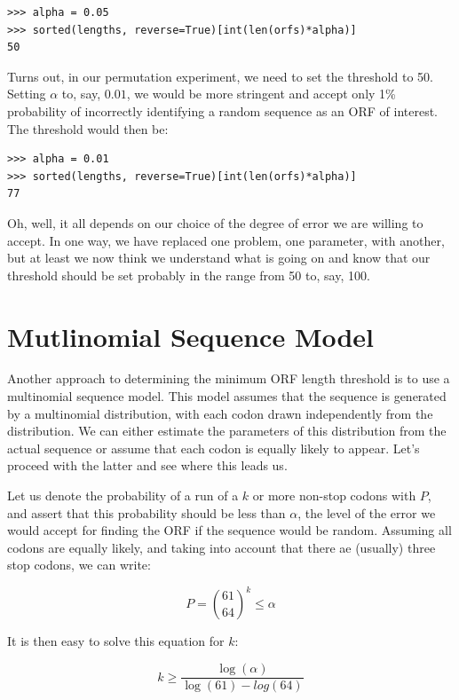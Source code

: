 \vspace*{3mm}
\begin{lstlisting}
>>> alpha = 0.05
>>> sorted(lengths, reverse=True)[int(len(orfs)*alpha)]
50
\end{lstlisting}

Turns out, in our permutation experiment, we need to set the threshold to 50. Setting $\alpha$ to, say, $0.01$, we would be more stringent and accept only 1\% probability of incorrectly identifying a random sequence as an ORF of interest. The threshold would then be:

\vspace*{3mm}
\begin{lstlisting}
>>> alpha = 0.01
>>> sorted(lengths, reverse=True)[int(len(orfs)*alpha)]
77
\end{lstlisting}

Oh, well, it all depends on our choice of the degree of error we are willing to accept. In one way, we have replaced one problem, one parameter, with another, but at least we now think we understand what is going on and know that our threshold should be set probably in the range from 50 to, say, 100.

\section{Mutlinomial Sequence Model}

Another approach to determining the minimum ORF length threshold is to use a multinomial sequence model. This model assumes that the sequence is generated by a multinomial distribution, with each codon drawn independently from the distribution. We can either estimate the parameters of this distribution from the actual sequence or assume that each codon is equally likely to appear. Let’s proceed with the latter and see where this leads us.

Let us denote the probability of a run of a $k$ or more non-stop codons with $P$, and assert that this probability should be less than $\alpha$, the level of the error we would accept for finding the ORF if the sequence would be random. Assuming all codons are equally likely, and taking into account that there ae (usually) three stop codons, we can write:

$$ P = \binom{61}{64}^k \leq \alpha $$

It is then easy to solve this equation for $k$:

$$ k \geq \frac{\log(\alpha)}{\log(61) - log(64)} $$

